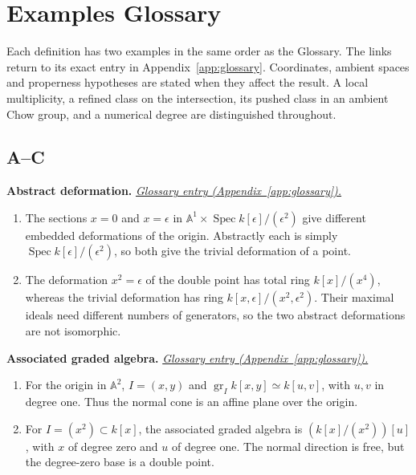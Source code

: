 \documentclass[11pt,a4paper]{article}
\numberwithin{equation}{section}
\theoremstyle{definition}
\newcommand{\A}{\mathbb A}
\newcommand{\Spec}{\operatorname{Spec}}
\newcommand{\gr}{\operatorname{gr}}
\begin{document}
\newpage
\section{Examples Glossary}
\label{app:examples-glossary}

Each definition has two examples in the same order as the Glossary.
The links return to its exact entry in Appendix~\ref{app:glossary}.
Coordinates, ambient spaces and properness hypotheses are stated when
they affect the result. A local multiplicity, a refined class on the
intersection, its pushed class in an ambient Chow group, and a numerical
degree are distinguished throughout.

\newcommand{\examplegloss}[3]{%
  \par\medskip\Needspace{5\baselineskip}\phantomsection\label{examples:#1}%
  \noindent\textbf{#2.}\quad
  \hyperref[gloss:#1]{\textit{Glossary entry (Appendix~\ref*{app:glossary}).}}\par
  #3\par}


\subsection*{A--C}

\examplegloss{abstract-deformation}{Abstract deformation}{
\begin{enumerate}[label=(\arabic*),leftmargin=*,itemsep=2pt,topsep=3pt]
\item The sections $x=0$ and $x=\epsilon$ in $\A^1\times\Spec k[\epsilon]/(\epsilon^2)$ give different embedded deformations of the origin. Abstractly each is simply $\Spec k[\epsilon]/(\epsilon^2)$, so both give the trivial deformation of a point.
\item The deformation $x^2=\epsilon$ of the double point has total ring $k[x]/(x^4)$, whereas the trivial deformation has ring $k[x,\epsilon]/(x^2,\epsilon^2)$. Their maximal ideals need different numbers of generators, so the two abstract deformations are not isomorphic.
\end{enumerate}}

\examplegloss{associated-graded-algebra}{Associated graded algebra}{
\begin{enumerate}[label=(\arabic*),leftmargin=*,itemsep=2pt,topsep=3pt]
\item For the origin in $\A^2$, $I=(x,y)$ and $\gr_I k[x,y]\simeq k[u,v]$, with $u,v$ in degree one. Thus the normal cone is an affine plane over the origin.
\item For $I=(x^2)\subset k[x]$, the associated graded algebra is $(k[x]/(x^2))[u]$, with $x$ of degree zero and $u$ of degree one. The normal direction is free, but the degree-zero base is a double point.
\end{enumerate}}
\end{document}
